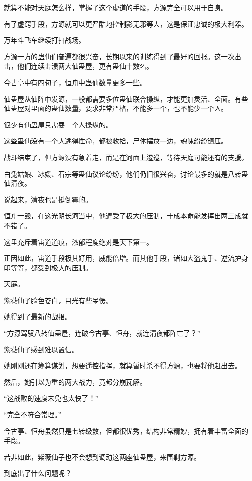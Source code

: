 \begin{this_body}
就算不能对天庭怎么样，掌握了这个虚道的手段，方源完全可以用于自身。

有了虚窍手段，方源就可以更严酷地控制影无邪等人，这是保证忠诚的极大利器。

万年斗飞车继续打扫战场。

方源一方的蛊仙们普遍都很兴奋，长期以来的训练得到了最好的回报。这一次出击，他们连续击溃两大仙蛊屋，更有蛊仙十数名。

今古亭中有四旬子，恒舟中蛊仙数量更多一些。

仙蛊屋从仙阵中发源，一般都需要多位蛊仙联合操纵，才能更加灵活、全面。有些仙蛊屋对里面的蛊仙数量，要求非常严格，不能多一个，也不能少一个人。

很少有仙蛊屋只需要一个人操纵的。

这些蛊仙没有一个人逃得性命，都被收拾，尸体摆放一边，魂魄纷纷镇压。

战斗结束了，但方源没有急着走，而是在河面上逡巡，等待天庭可能还有的支援。

白兔姑娘、冰媛、石宗等蛊仙议论纷纷，他们仍旧很兴奋，讨论最多的就是八转蛊仙清夜。

说起来，清夜也是挺倒霉的。

恒舟一毁，在这光阴长河当中，他遭受了极大的压制，十成本命能发挥出两三成就不错了。

这里充斥着宙道道痕，浓郁程度绝对是天下第一。

正因如此，宙道手段极其好用，威能倍增。而其他手段，诸如大盗鬼手、逆流护身印等等，都受到极大的压制。

天庭。

紫薇仙子脸色苍白，目光有些呆愣。

她得到了最新的战报。

“方源驾驭八转仙蛊屋，连破今古亭、恒舟，就连清夜都阵亡了？”

紫薇仙子感到难以置信。

她刚刚还在筹算谋划，想要遥控指挥，就算暂时杀不得方源，也要将他赶出去。

然后，她引以为重的两大战力，竟都分崩瓦解。

“这战败的速度未免也太快了！”

“完全不符合常理。”

今古亭、恒舟虽然只是七转级数，但都很优秀，结构非常精妙，拥有着丰富全面的手段。

若非如此，紫薇仙子也不会想到调动这两座仙蛊屋，来围剿方源。

到底出了什么问题呢？


\end{this_body}

